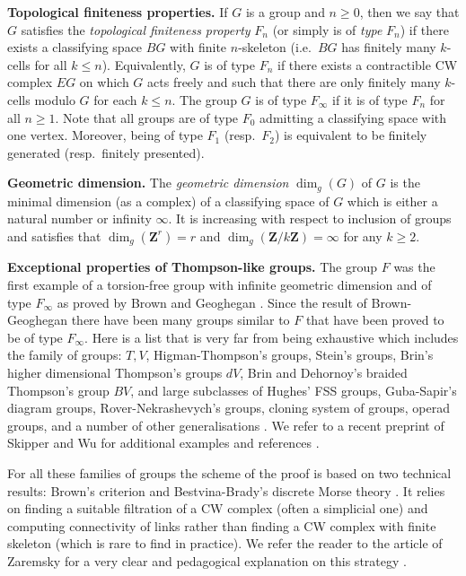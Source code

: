 \documentclass[a4paper, 12pt]{amsart}
\numberwithin{equation}{section}
\theoremstyle{definition}
\newcommand{\Z}{\mathbf{Z}}
\begin{document}
{\bf Topological finiteness properties.}
If $G$ is a group and $n\geq 0$, then we say that $G$ satisfies the {\it topological finiteness property} $F_n$ (or simply is of {\it type} $F_n$) if there exists a classifying space $BG$ with finite $n$-skeleton (i.e.~$BG$ has finitely many $k$-cells for all $k\leq n$).
Equivalently, $G$ is of type $F_n$ if there exists a contractible CW complex $EG$ on which $G$ acts freely and such that there are only finitely many $k$-cells modulo $G$ for each $k\leq n$.
The group $G$ is of type $F_\infty$ if it is of type $F_n$ for all $n\geq 1.$
Note that all groups are of type $F_0$ admitting a classifying space with one vertex.
Moreover, being of type $F_1$ (resp.~$F_2$) is equivalent to be finitely generated (resp.~finitely presented).

{\bf Geometric dimension.}
The {\it geometric dimension} $\dim_g(G)$ of $G$ is the minimal dimension (as a complex) of a classifying space of $G$ which is either a natural number or infinity $\infty$. 
It is increasing with respect to inclusion of groups and satisfies that $\dim_g(\Z^r)=r$ and $\dim_g(\Z/k\Z)=\infty$ for any $k\geq 2.$

{\bf Exceptional properties of Thompson-like groups.}
The group $F$ was the first example of a torsion-free group with infinite geometric dimension and of type $F_\infty$ as proved by Brown and Geoghegan \cite{Brown-Geoghegan84}.
Since the result of Brown-Geoghegan there have been many groups similar to $F$ that have been proved to be of type $F_\infty$. 
Here is a list that is very far from being exhaustive which includes the family of groups: $T,V$, Higman-Thompson's groups, Stein's groups, Brin's higher dimensional Thompson's groups $dV$, Brin and Dehornoy's braided Thompson's group $BV$, and large subclasses of Hughes' FSS groups, Guba-Sapir's diagram groups, Rover-Nekrashevych's groups, cloning system of groups, operad groups, and a number of other generalisations \cite{Brown87, Stein92,Kochloukova-Martinez-Perez-Nucinkis13, Fluch-Marschler-Witzel-Zaremsky13, Bux-Fluch-Marschler-Witzel-Zaremsky16,Farley-Hughes15,Witzel-Zaremsky18, Thumann17}.
We refer to a recent preprint of Skipper and Wu for additional examples and references \cite{Skipper-Wu21}.

For all these families of groups the scheme of the proof is based on two technical results: Brown's criterion and Bestvina-Brady's discrete Morse theory \cite{Brown87,Bestvina-Brady97}.
It relies on finding a suitable filtration of a CW complex (often a simplicial one) and computing connectivity of links rather than finding a CW complex with finite skeleton (which is rare to find in practice).
We refer the reader to the article of Zaremsky for a very clear and pedagogical explanation on this strategy \cite{Zaremsky21}.
\end{document}

